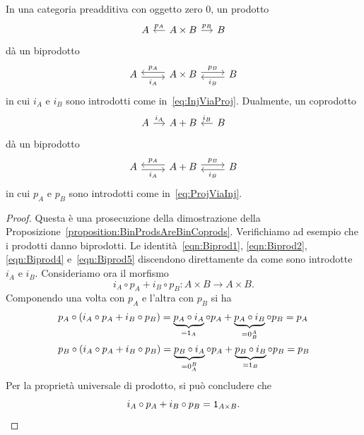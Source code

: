 \begin{proposition}\label{proposition:ProdsAndCoprodsAreBiprods}
  In una categoria preadditiva con oggetto zero \(0\), un prodotto
  \[
    \begin{tikzcd}[column sep=small]
      A & A \times B \ar["{p_A}", l, swap] \ar["{p_B}", r] & B
    \end{tikzcd}
  \]
  dà un biprodotto
  \[
    \begin{tikzcd}
      A \ar["{i_A}", r, shift right, swap] & A \times B \ar["{p_A}", l,
      shift right, swap] \ar["{p_B}", r, shift left] & B \ar["{i_B}", l,
      shift left]
    \end{tikzcd}
  \]
  in cui \(i_A\) e \(i_B\) sono introdotti come
  in~\eqref{eq:InjViaProj}. Dualmente, un coprodotto
  \[
    \begin{tikzcd}[column sep=small]
      A \ar["{i_A}", r] & A + B & B \ar["{i_B}", l, swap]
    \end{tikzcd}
  \]
  dà un biprodotto
  \[
    \begin{tikzcd}
      A \ar["{i_A}", r, shift right, swap] & A+B \ar["{p_A}", l, shift
      right, swap] \ar["{p_B}", r, shift left] & B \ar["{i_B}", l, shift
      left]
    \end{tikzcd}
  \]
  in cui \(p_A\) e \(p_B\) sono introdotti come
  in~\eqref{eq:ProjViaInj}.
\end{proposition}

\begin{proof}
  Questa è una prosecuzione della dimostrazione della
  Proposizione~\ref{proposition:BinProdsAreBinCoprods}. Verifichiamo ad
  esempio che i prodotti danno biprodotti. Le
  identità~\eqref{eqn:Biprod1}, \eqref{eqn:Biprod2}, \eqref{eqn:Biprod4}
  e~\eqref{eqn:Biprod5} discendono direttamente da come sono introdotte
  \(i_A\) e \(i_B\). Consideriamo ora il morfismo
  \[
    i_A \circ p_A + i_B \circ p_B : A \times B \to A \times B .
  \]
  Componendo una volta con \(p_A\) e l'altra con \(p_B\) si ha
  \begin{align*}
    & p_A \circ \left(i_A \circ p_A + i_B \circ p_B\right) = \underbrace{p_A \circ
      i_A}_{= \id_A} \circ p_A + \underbrace{p_A
      \circ i_B}_{= 0_B^A} \circ p_B = p_A \\
    & p_B \circ \left(i_A \circ p_A + i_B \circ p_B\right) = \underbrace{p_B \circ
      i_A}_{= 0_A^B} \circ p_A + \underbrace{p_B
      \circ i_B}_{= \id_B} \circ p_B = p_B
  \end{align*}
  Per la proprietà universale di prodotto, si può concludere che
  \[
    i_A \circ p_A + i_B \circ p_B = \mathtt 1_{A \times B} . \qedhere
  \]
\end{proof}

